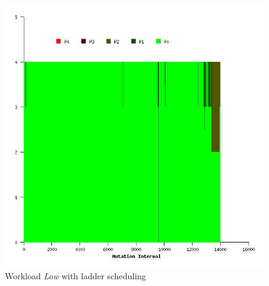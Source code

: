 \begin{figure}
  \begin{center}
    \includegraphics[scale=0.4]{figures/mutation_timeline_figures/mut_t0/Low/125_4.jpeg}%
    \caption{Workload \textit{Low} with ladder scheduling}
    \label{fig:wrk_low_ladder}
  \end{center}
\end{figure}

